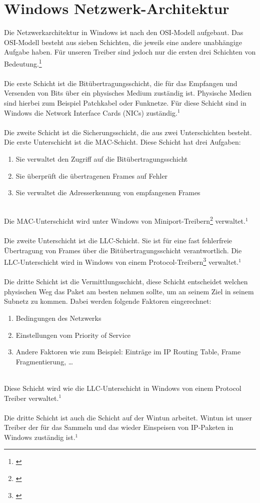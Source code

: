 \section{Windows Netzwerk-Architektur}

Die Netzwerkarchitektur in Windows ist nach den OSI-Modell aufgebaut. Das OSI-Modell besteht aus sieben Schichten, die jeweils eine andere unabhängige Aufgabe haben. Für unseren Treiber sind jedoch nur die ersten drei Schichten von Bedeutung.\footnote[1]{\cite[Vgl.][]{27}}
\\\\
Die erste Schicht ist die Bitübertragungsschicht, die für das Empfangen und Versenden von Bits über ein physisches Medium zuständig ist. Physische Medien sind hierbei zum Beispiel Patchkabel oder Funknetze. Für diese Schicht sind in Windows die Network Interface Cards (NICs) zuständig.$^{1}$
\\\\
Die zweite Schicht ist die Sicherungsschicht, die aus zwei Unterschichten besteht. Die erste Unterschicht ist die MAC-Schicht. Diese Schicht hat drei Aufgaben:
\\
\begin{enumerate}
    \item Sie verwaltet den Zugriff auf die Bitübertragungsschicht
    \item Sie überprüft die übertragenen Frames auf Fehler
    \item Sie verwaltet die Adresserkennung von empfangenen Frames
\end{enumerate}
\ \\
Die MAC-Unterschicht wird unter Windows von Miniport-Treibern\footnote[2]{\cite[Vgl.][]{25}} verwaltet.$^{1}$
\\\\
Die zweite Unterschicht ist die LLC-Schicht. Sie ist für eine fast fehlerfreie Übertragung von Frames über die Bitübertragungsschicht verantwortlich. Die LLC-Unterschicht wird in Windows von einem Protocol-Treibern\footnote[3]{\cite[Vgl.][]{26}} verwaltet.$^{1}$
\\\\
Die dritte Schicht ist die Vermittlungsschicht, diese Schicht entscheidet welchen physischen Weg das Paket am besten nehmen sollte, um an seinem Ziel in seinem Subnetz zu kommen. Dabei werden folgende Faktoren eingerechnet:
\\
\begin{enumerate}
    \item Bedingungen des Netzwerks
    \item Einstellungen vom Priority of Service
    \item Andere Faktoren wie zum Beispiel: Einträge im IP Routing Table, Frame Fragmentierung, …
\end{enumerate}
\ \\
Diese Schicht wird wie die LLC-Unterschicht in Windows von einem Protocol Treiber verwaltet.$^{1}$
\\\\
Die dritte Schicht ist auch die Schicht auf der Wintun arbeitet. Wintun ist unser Treiber der für das Sammeln und das wieder Einspeisen von IP-Paketen in Windows zuständig ist.$^{1}$


